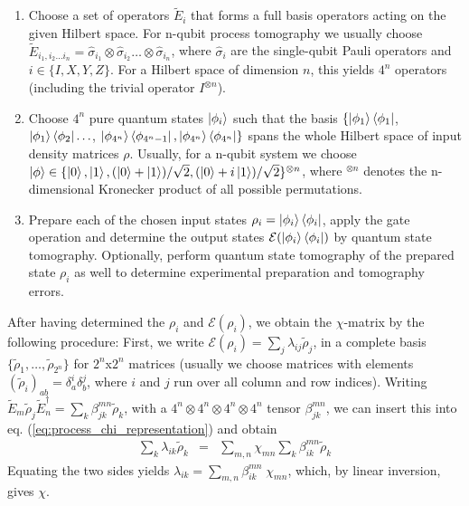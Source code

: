 \begin{enumerate}
\item Choose a set of operators $\tilde{E}_i$ that forms a full basis operators acting on the given Hilbert space. For n-qubit process tomography we usually choose $\tilde{E}_{i_1,i_2 \hdots i_n} = \hat{\sigma}_{i_1}\otimes \hat{\sigma}_{i_2}\hdots\otimes\hat{\sigma}_{i_n}$, where $\hat{\sigma}_i$ are the single-qubit Pauli operators and $i\in\{I,X,Y,Z\}$. For a Hilbert space of dimension $n$, this yields $4^n$ operators (including the trivial operator $I^{\otimes n}$).
\item Choose $4^n$ pure quantum states $\left| \phi_i \right>$ such that the basis $\{\left| \phi_1 \right>\left< \phi_1 \right|$, $\left| \phi_1 \right>\left< \phi_2 \right|\hdots$, $\left| \phi_{4^n} \right>\left< \phi_{4^n-1} \right|,\left| \phi_{4^n} \right>\left< \phi_{4^n} \right|\}$ spans the whole Hilbert space of input density matrices $\rho$. Usually, for a n-qubit system we choose $\left| \phi \right> \in \{\left| 0 \right>,\left| 1 \right>,(\left| 0 \right>+\left| 1 \right>)/\sqrt{2},(\left| 0 \right>+i\left| 1 \right>)/\sqrt{2}\}^{\otimes n}$, where $^{\otimes n}$ denotes the n-dimensional Kronecker product of all possible permutations.
\item Prepare each of the chosen input states $\rho_i = \left| \phi_i \right>\left< \phi_i \right|$, apply the gate operation and determine the output states $\mathcal{E}(\left| \phi_i \right>\left< \phi_i \right|)$ by quantum state tomography. Optionally, perform quantum state tomography of the prepared state $\rho_i$ as well to determine experimental preparation and tomography errors.
\end{enumerate}

After having determined the $\rho_i$ and $\mathcal{E}(\rho_i)$, we obtain the $\chi$-matrix by the following procedure: First, we write $\mathcal{E}(\rho_i) = \sum_j \lambda_{ij} \tilde{\rho}_j$, in a complete basis $\{\tilde{\rho}_1,\hdots,\tilde{\rho}_{2^n}\}$ for $2^n$x$2^n$ matrices (usually we choose matrices with elements $(\tilde{\rho}_i)_{ab}=\delta_a^i\delta_b^j$, where $i$ and $j$ run over all column and row indices). Writing $\tilde{E}_m \tilde{\rho}_j \tilde{E}_n^\dagger = \sum_k \beta_{jk}^{mn}\tilde{\rho}_k$, with a $4^n\otimes 4^n \otimes 4^n \otimes 4^n$ tensor $\beta_{jk}^{mn}$, we can insert this into eq. (\ref{eq:process_chi_representation}) and obtain
%
\begin{eqnarray}
\sum\limits_k \lambda_{ik} \tilde{\rho}_k & = & \sum\limits_{m,n} \chi_{mn} \sum\limits_k \beta_{ik}^{mn} \tilde{\rho}_k  
\end{eqnarray}
%
Equating the two sides yields $\lambda_{ik} = \sum_{m,n}\beta_{ik}^{mn}\; \chi_{mn}$, which, by linear inversion,  gives $\chi$.

